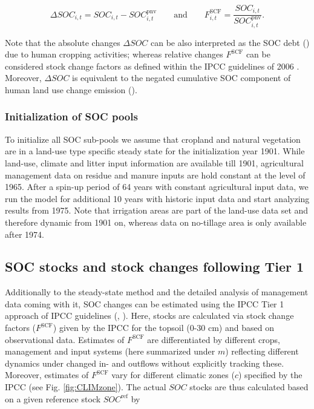 \documentclass[gc, manuscript]{copernicus}
\begin{document}
\begin{equation}
\Delta SOC_{i,t} = SOC_{i,t} - SOC^{\mathrm{pnv}}_{i,t}\qquad \text{and} \qquad  F^{\mathrm{SCF}}_{i,t} = \frac{SOC_{i,t}}{SOC^{\mathrm{pnv}}_{i,t}} .
\label{eq:stockdiff}
\end{equation}

Note that the absolute changes \(\Delta SOC\) can be also interpreted as the SOC debt (\citep{sanderman_soil_2017}) due to human cropping activities; whereas relative changes \(F^{\mathrm{SCF}}\) can be considered stock change factors as defined within the IPCC guidelines of 2006 \citep{eggleston_ipcc_2006}. Moreover, \(\Delta SOC\) is equivalent to the negated cumulative SOC component of human land use change emission (\citep{pugh_simulated_2015}).

\hypertarget{sec:initsoc}{%
\subsubsection{Initialization of SOC pools}\label{sec:initsoc}}

To initialize all SOC sub-pools we assume that cropland and natural vegetation are in a land-use type specific steady state for the initialization year 1901. While land-use, climate and litter input information are available till 1901, agricultural management data on residue and manure inputs are hold constant at the level of 1965. After a spin-up period of 64 years with constant agricultural input data, we run the model for additional 10 years with historic input data and start analyzing results from 1975. Note that irrigation areas are part of the land-use data set and therefore dynamic from 1901 on, whereas data on no-tillage area is only available after 1974.

\hypertarget{sec:tier1}{%
\subsection{SOC stocks and stock changes following Tier 1}\label{sec:tier1}}

Additionally to the steady-state method \citep{calvo_buendia_ipcc_2019} and the detailed analysis of management data coming with it, SOC changes can be estimated using the IPCC Tier 1 approach of IPCC guidelines (\citep{eggleston_ipcc_2006}, \citep{calvo_buendia_ipcc_2019}). Here, stocks are calculated via stock change factors (\(F^{\mathrm{SCF}}\)) given by the IPCC for the topsoil (0-30 cm) and based on observational data. Estimates of \(F^{\mathrm{SCF}}\) are differentiated by different crops, management and input systems (here summarized under \(m\)) reflecting different dynamics under changed in- and outflows without explicitly tracking these. Moreover, estimates of \(F^{\mathrm{SCF}}\) vary for different climatic zones (\(c\)) specified by the IPCC (see Fig. \ref{fig:CLIMzone}). The actual \(SOC\) stocks are thus calculated based on a given reference stock \(SOC^{\mathrm{ref}}\) by
\end{document}
